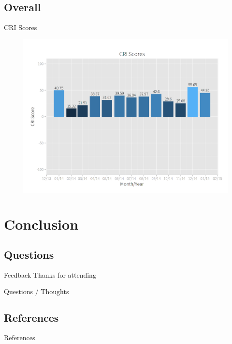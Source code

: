     \subsection{Overall}
        \begin{frame}{CRI Scores}
            \begin{figure}
                \centering
                \includegraphics[scale=.23]{images/cri_scores.png}
            \end{figure}
        \end{frame}

\section{Conclusion}

    \subsection{Questions}
        \begin{frame}{Feedback}
            \center 
            Thanks for attending
            
            Questions / Thoughts
          
        \end{frame}

    \subsection{References}
        \begin{frame}{References}
            
            
          
        \end{frame}


